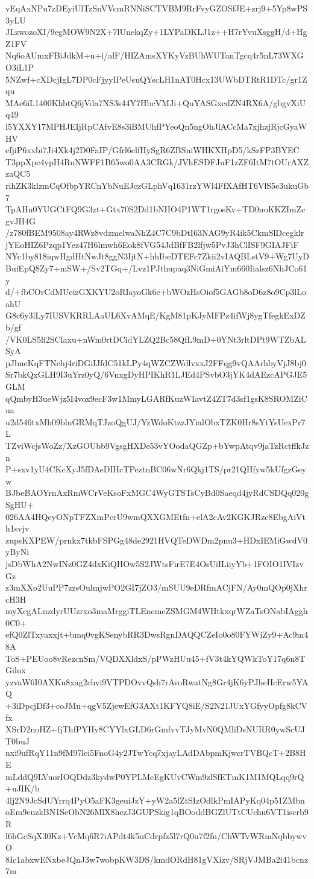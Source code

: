 vEqAxNPu7zDEyiUlTzSnVVcmRNNiSCTVBM9RrFvyGZOSfJE+zrj9+5Yp8wPS3yLU
JLzwozoXI/9egMOW9N2X+7lUnekqZy+1LYPaDKLJ1z++H7rYvuXsggH/d+HgZ1FV
Nq6oAUmxFBiJdkM+u+i/alF/HIZAmsXYKyVzBUhWUTanTgcq4r5nL73WXGO3iL1P
5NZwf+cXDcjIgL7DP0cFjyyIPeUsuQYscLH1nAT0Hcx13UWbDTRtR1DTc/gr1Zqu
MAe6iL1400KhbtQ6jVda7NS3s44Y7HbcVMJi+QuYASGxcdZN4RX6A/gbgvXiUq49
l5YXXY17MPHJEIjRpCAfvE8s3iBMUhfPYeoQn5ngOhJlACcMa7xjhzjRjcGyaWHV
efjiP6xxbi7Ji4Xk4j2D0FaIP/Gfrl6clfHySgR6ZBSniWHKXHpD5/kSzFP3BYEC
T3ppXpc4ypH4RuNWFF1B65wo0AA3CRGk/JVhESDFJuF1zZF6ItM7tOUrAXZzaQC5
rihZK3klzmCqOfbpYRCnYbNuEJczGLphVq1631rzYWl4FfXAfHT6VlS5e3ukuGb7
TpAHn0YUGCtFQ9G3zt+Gtx70S2Dd1bNHO4P1WT1rgosKv+TD0noKKZImZcgvJH4G
/z780fBEM9508ay4RWz8vdzmelwaNhZ4C7C9bDtI63NAG9yR4ik5CkmSlDcegklr
jYEoHIZ6Pzqp1Yez47H6lmwh6Eok8fVG54JdBfFB2lfjw5PvJ3hClISF9GIAJFiF
NYc1by818iqwHgdHtNwJt8ggN3IjtN+hhIbeDTEFc7Zkii2vIAQBLstV9+Wg7UyD
BuiEpQ8Zy7+mSW+/Sv2TGq+/Lvz1PJthupaq3NiGmiAiYm660Iialsz6NhJCo61y
d/+fbCOrCdMUeizGXKYU2oRIayoGk6e+bWOzHsOiof5GAGb8oD6z8o9Cp3lLoahU
G8c6y3lLy7IUSVKRRLAaUL6XvAMqE/KgM81pKJyMFPz4ifWj8ygTfegkExDZb/gf
/VK0LS5li2SClaxu+nWm0rtDCidYLZQ2Bc58QfL9mD+0YNt3rltDPt9WTZbALSyA
pJbneKqFTNehj4riDGiIJfdC51kLPy4qWZCZWdlvxxJ2FFqg9vQAArhbyVjJ8bj0
Sr7bkQxGLH9I3uYrz0yQ/6VnxgDyHPIKhR1LJEd4PSvbO3jYK4dAEzcAPGJE5GLM
qQmbyH3ueWjz5I4vox9ecF3w1MmyLGARfKuzWIavtZ4ZT7d3sf1gsK8SROMZiCua
u2d546txMh09blnGRMqTJzoQgUJ/YzWdoKtzzJYialObxTZK0Hr8sYtYsUexPr7L
TZviWcjsWoZz/XzGOUbb9VgsgHXDe53vYOodaQGZp+bYwpAtqv9jaTzRctffkJzn
P+sxv1yU4CKcXyJ5fDAeDIHcTPeztnBC06wNr6Qkj1TS/pr21QHfyw5kUfgzGeyw
BJbeBAOYrnAxRmWCrVeKsoFxMGC4WyGTSTsCyBd0Saeqd4jyRdCSDQq020gSgHU+
026AA4HQeyONpTFZXmPcrU9wmQXXGMEtfn+elA2cAv2KGKJRzc8EbgAiVth1svjv
zupsKXPEW/prnkx7tkbFSPGg48de2921HVQTeDWDm2pnu3+HDxIEMiGwdV0yByNi
jsDbWhA2NwINz0GZ4dxKiQHOw5S2JWtsFirE7E4OsUiILiiyYb+1FOIO1IVIzvGz
z3mXXo2UuPP7zzsOulmjwPO2GI7jZO3/mSUU9eDRfmACjFN/Ay0mQOp0jXhrcH3H
myXcgALuzdyrUUzrxo3maMrggiTLEnemeZSMGM4WHtkxqrWZaTsONabIAggh0C0+
efQ0ZlTxyaxxjt+bmq0vgKSenybRR3DwsRgnDAQQCZeIo0o80FYWiZy9+Ac9m48A
ToS+PEUoo8vRezcnSm/VQDXXldxS/pPWzHUu45+fV3t4kYQWkToY17q6n8TGilnx
yzvaW6I0AXKu8xag2chvi9VTPDOvvQsh7rAvoRwatNg8Gr4jK6yPJheHcErw5YAQ
+3iDpcjDf3+coJMu+qgV5ZjewEfG3AXt1KFYQ8iE/S2N21JUxYGfyyOpfg8kCVfx
XSrD2noHZ+fjThfPYHy8CYYlxGLD6rGmfvvTJyMvN0QMliDsNURR0ywScUJT0buJ
nxi9ufRqY11n9fM97lei5FnoG4y2JTwYcq7xjayLAdDAbpmKjwcrTVBQcT+2B8HE
mLddQ9LVuorIOQDdz3kydwP0YPLMeEgKUvCWm9zlSfETmK1M1MQLqq9rQ+uJIK/b
4lj2N9JcSdUYrrq4PyO5aFK3geuiJzY+yW2a5lZtSIzOdlkPmIAPyKq04p51ZMbn
oEm9euzkBN1SeObN26MlX8hezJ3GUPSkig1qBOoddBGZlUTtCUchu6VT1iscrb9R
l6hGcSqX30Kz+VcMq6R7iAPdt4k5uCdrpfz5l7rQ0u7f2fn/ChWTvWRmNqbbywvO
8Ic1abxwENxbeJQnJ3w7wobpKW3DS/kmdORdH81gVXizv/SRjVJMBa2i41bcnz7m
